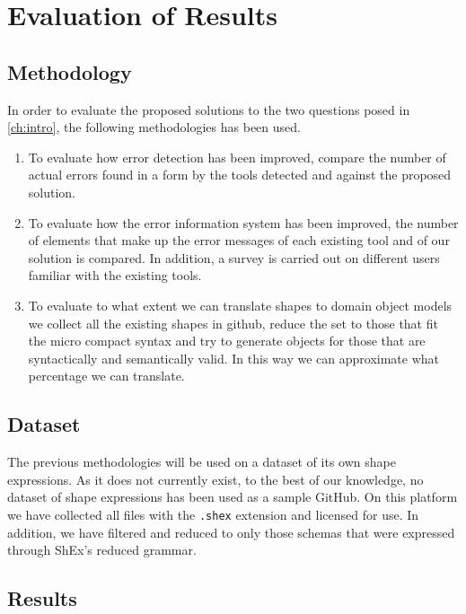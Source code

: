 \chapter{Evaluation of Results}
\label{ch:results-evaluation}

\section{Methodology}
In order to evaluate the proposed solutions to the two questions posed in \cref{ch:intro},
the following methodologies has been used.

\begin{enumerate}
    \item To evaluate how error detection has been improved, compare the number of actual errors found
    in a form by the tools detected and against the proposed solution.
    
    \item To evaluate how the error information system has been improved, the number of elements that
    make up the error messages of each existing tool and of our solution is compared. In addition,
    a survey is carried out on different users familiar with the existing tools.

    \item To evaluate to what extent we can translate shapes to domain object models we collect all the
    existing shapes in github, reduce the set to those that fit the micro compact syntax and try to
    generate objects for those that are syntactically and semantically valid. In this way we can
    approximate what percentage we can translate.
\end{enumerate}

\section{Dataset}
The previous methodologies will be used on a dataset of its own shape expressions. As it does not currently
exist, to the best of our knowledge, no dataset of shape expressions has been used as a sample GitHub.
On this platform we have collected all files with the \texttt{.shex} extension and licensed for use. In addition,
we have filtered and reduced to only those schemas that were expressed through ShEx's reduced grammar.

\section{Results}